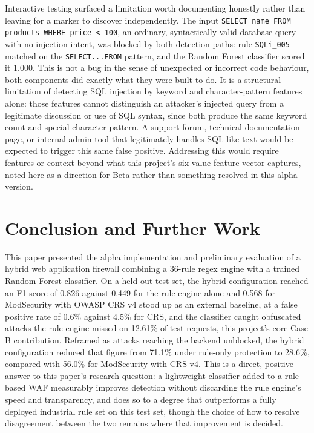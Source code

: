 \documentclass[runningheads]{llncs}
\begin{document}
Interactive testing surfaced a limitation worth documenting honestly
rather than leaving for a marker to discover independently. The input
\texttt{SELECT name FROM products WHERE price < 100}, an ordinary,
syntactically valid database query with no injection intent, was
blocked by both detection paths: rule \texttt{SQLi\_005} matched on
the \texttt{SELECT...FROM} pattern, and the Random Forest classifier
scored it 1.000. This is not a bug in the sense of unexpected or
incorrect code behaviour, both components did exactly what they were
built to do. It is a structural limitation of detecting SQL injection
by keyword and character-pattern features alone: those features cannot
distinguish an attacker's injected query from a legitimate discussion
or use of SQL syntax, since both produce the same keyword count and
special-character pattern. A support forum, technical documentation
page, or internal admin tool that legitimately handles SQL-like text
would be expected to trigger this same false positive. Addressing this
would require features or context beyond what this project's six-value
feature vector captures, noted here as a direction for Beta rather than
something resolved in this alpha version.

\section{Conclusion and Further Work}
\label{sec:conclusion}

This paper presented the alpha implementation and preliminary
evaluation of a hybrid web application firewall combining a
36-rule regex engine with a trained Random Forest classifier. On a
held-out test set, the hybrid configuration reached an F1-score of
0.826 against 0.449 for the rule engine alone and 0.568 for
ModSecurity with OWASP CRS v4 stood up as an external baseline, at a
false positive rate of 0.6\% against 4.5\% for CRS, and the classifier
caught obfuscated attacks the rule engine missed on 12.61\% of test
requests, this project's core Case B contribution. Reframed as attacks
reaching the backend unblocked, the hybrid configuration reduced that
figure from 71.1\% under rule-only protection to 28.6\%, compared with
56.0\% for ModSecurity with CRS v4. This is a direct, positive answer
to this paper's research question: a lightweight classifier added to a
rule-based WAF measurably improves detection without discarding the
rule engine's speed and transparency, and does so to a degree that
outperforms a fully deployed industrial rule set on this test set,
though the choice of how to
resolve disagreement between the two remains where that improvement
is decided.
\end{document}

